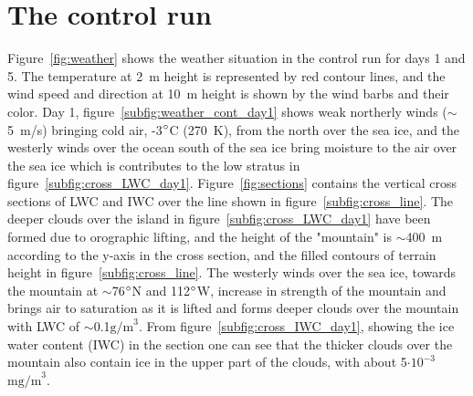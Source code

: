 \section{The control run}
Figure~\ref{fig:weather} shows the weather situation in the control run for days 1 and 5. The temperature at 2~m height is represented by red contour lines, and the wind speed and direction at 10~m height is shown by the 
wind barbs and their color. Day 1, figure~\ref{subfig:weather_cont_day1} shows weak northerly winds ($\sim$ 5~m/s) bringing cold air, -3$\degree$C (270~K), from the north over the sea ice, and the westerly winds over the ocean south of the sea ice bring moisture to the air over the sea ice which is contributes to the low stratus in figure~\ref{subfig:cross_LWC_day1}. Figure~\ref{fig:sections} contains the vertical cross sections of LWC and IWC over the line shown in figure~\ref{subfig:cross_line}. The deeper clouds over the island in figure~\ref{subfig:cross_LWC_day1} have been formed due to orographic lifting, and the height of the "mountain" is $\sim$400~m according to the y-axis in the cross section, and the filled contours of terrain height in figure~\ref{subfig:cross_line}. The westerly winds over the sea ice, towards the mountain at $\sim$76$\degree$N and 112$\degree$W, increase in strength of the mountain and brings air to saturation as it is lifted and forms deeper clouds over the mountain with LWC of $\sim$0.1$\text{g/m}^3$. From figure~\ref{subfig:cross_IWC_day1}, showing the ice water content (IWC) in the section one can see that the thicker clouds over the mountain also contain ice in the upper part of the clouds, with about 5$\cdot\text{10}^{-3}$~$\text{mg/m}^3$. 


